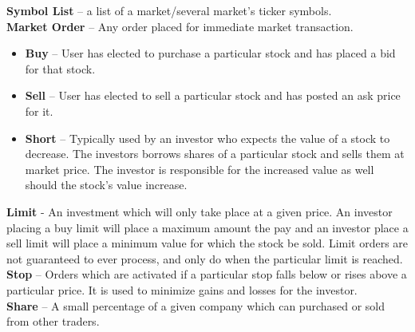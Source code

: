 {\textbf{Symbol List} -- a list of a market/several market's ticker symbols.\\


\textbf{Market Order} -- Any order placed for immediate market transaction.\\

\begin{itemize}
    \item \textbf{Buy} -- User has elected to purchase a particular stock and has placed
    a bid for that stock.\\

    \item \textbf{Sell} -- User has elected to sell a particular stock and has posted an
    ask price for it.\\

    \item \textbf{Short} -- Typically used by an investor who expects the value of
    a stock to decrease. The investors borrows shares of a particular stock and sells
    them at market price. The investor is responsible for the increased value as well
    should the stock's value increase.\\
    \end{itemize}

\textbf{Limit} - An investment which will only take place at a given price. An
investor placing a buy limit will place a maximum amount the pay and an investor
place a sell limit will place a minimum value for which the stock be sold. Limit
orders are not guaranteed to ever process, and only do when the particular limit
is reached.\\

\textbf{Stop} -- Orders which are activated if a particular stop falls below or
rises above a particular price. It is used to minimize gains and losses for the
investor.\\

\textbf{Share} -- A small percentage of a given company which can purchased or
sold from other traders.\\
}
